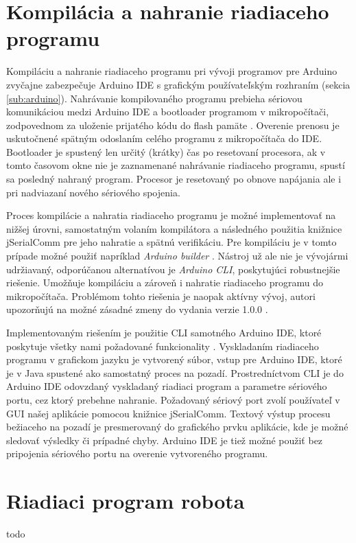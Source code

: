\section{Kompilácia a nahranie riadiaceho programu}
\label{sub:arduinoIDE}
Kompiláciu a nahranie riadiaceho programu pri vývoji programov pre Arduino zvyčajne zabezpečuje Arduino IDE s grafickým používateľským rozhraním (sekcia \ref{sub:arduino}). Nahrávanie kompilovaného programu prebieha sériovou komunikáciou medzi Arduino IDE a bootloader programom v mikropočítači, zodpovednom za uloženie prijatého kódu do flash pamäte \cite{sketchUpload}. Overenie prenosu je uskutočnené spätným odoslaním celého programu z mikropočítača do IDE. Bootloader je spustený len určitý (krátky) čas po resetovaní procesora, ak v tomto časovom okne nie je zaznamenané nahrávanie riadiaceho programu, spustí sa posledný nahraný program. Procesor je resetovaný po obnove napájania ale i pri nadviazaní nového sériového spojenia.

Proces kompilácie a nahratia riadiaceho programu je možné implementovať na nižšej úrovni, samostatným volaním kompilátora a následného použitia knižnice jSerialComm pre jeho nahratie a spätnú verifikáciu. Pre kompiláciu je v tomto prípade možné použiť napríklad \textit{Arduino builder} \cite{arduinoBuilder}. Nástroj už ale nie je vývojármi udržiavaný, odporúčanou alternatívou je \textit{Arduino CLI}, poskytujúci robustnejšie riešenie. Umožňuje kompiláciu a zároveň i nahratie riadiaceho programu do mikropočítača. Problémom tohto riešenia je naopak aktívny vývoj, autori upozorňujú na možné zásadné zmeny do vydania verzie 1.0.0 \cite{arduinoCli}.

Implementovaným riešením je použitie CLI samotného Arduino IDE, ktoré poskytuje všetky nami požadované funkcionality \cite{arduinoIdeCli}. Vyskladaním riadiaceho programu v grafickom jazyku je vytvorený súbor, vstup pre Arduino IDE, ktoré je v Java spustené ako samostatný proces na pozadí. Prostredníctvom CLI je do Arduino IDE odovzdaný vyskladaný riadiaci program a parametre sériového portu, cez ktorý prebehne nahranie. Požadovaný sériový port zvolí používateľ v GUI našej aplikácie pomocou knižnice jSerialComm. Textový výstup procesu bežiaceho na pozadí je presmerovaný do grafického prvku aplikácie, kde je možné sledovať výsledky či prípadné chyby. Arduino IDE je tiež možné použiť bez pripojenia sériového portu na overenie vytvoreného programu.


\section{Riadiaci program robota}
todo













